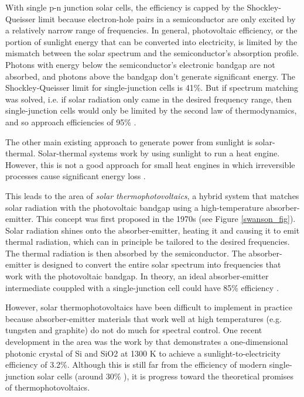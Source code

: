\documentclass[%
 reprint,
 amsmath,amssymb,
 aps
]{revtex4-2}
\begin{document}
With single p-n junction solar cells, the efficiency is capped by the Shockley-Queisser limit \cite{shockley} because electron-hole pairs in a semiconductor are only excited by a relatively narrow range of frequencies. In general, photovoltaic efficiency, or the portion of sunlight energy that can be converted into electricity, is limited by the mismatch between the solar spectrum and the semiconductor's absorption profile. Photons with energy below the semiconductor's electronic bandgap are not absorbed, and photons above the bandgap don't generate significant energy. The Shockley-Queisser limit for single-junction cells is 41\%. But if spectrum matching was solved, i.e. if solar radiation only came in the desired frequency range, then single-junction cells would only be limited by the second law of thermodynamics, and so approach efficiencies of 95\% \cite{shanhui}. 

The other main existing approach to generate power from sunlight is solar-thermal. Solar-thermal systems work by using sunlight to run a heat engine. However, this is not a good approach for small heat engines in which irreversible processes cause significant energy loss \cite{lenert}.

This leads to the area of {\it solar thermophotovoltaics}, a hybrid system that matches solar radiation with the photovoltaic bandgap using a high-temperature absorber-emitter. This concept was first proposed in the 1970s \cite{swanson} (see Figure \ref{swanson_fig}). Solar radiation shines onto the absorber-emitter, heating it and causing it to emit thermal radiation, which can in principle be tailored to the desired frequencies. The thermal radiation is then absorbed by the semiconductor. The absorber-emitter is designed to convert the entire solar spectrum into frequencies that work with the photovoltaic bandgap. In theory, an ideal absorber-emitter intermediate couppled with a single-junction cell could have 85\% efficiency \cite{harder}. 

However, solar thermophotovoltaics have been difficult to implement in practice because absorber-emitter materials that work well at high temperatures (e.g. tungsten and graphite) do not do much for spectral control. One recent development in the area was the work by \cite{lenert} that demonstrates a one-dimensional photonic crystal of Si and SiO2 at 1300 K to achieve a sunlight-to-electricity efficiency of 3.2\%. Although this is still far from the efficiency of modern single-junction solar cells (around 30\% \cite{conversion_eff}), it is progress toward the theoretical promises of thermophotovoltaics. 
\end{document}
